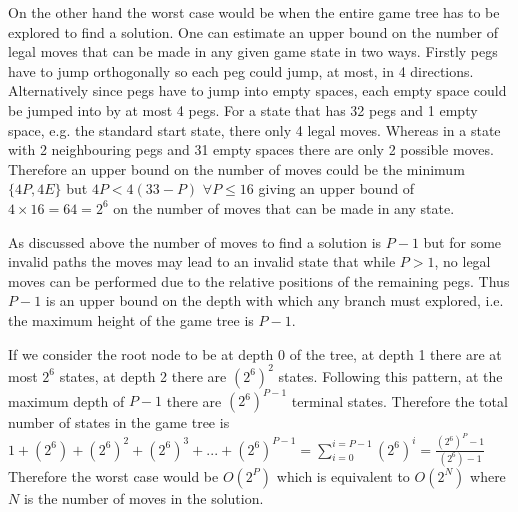 \documentclass[10pt]{article}
\begin{document}
On the other hand the worst case would be when the entire game tree has to be explored to find a solution. One can estimate an upper bound on the number of legal moves that can be made in any given game state in two ways. Firstly pegs have to jump orthogonally so each peg could jump, at most, in 4 directions. Alternatively since pegs have to jump into empty spaces, each empty space could be jumped into by at most 4 pegs. For a state that has 32 pegs and 1 empty space, e.g. the standard start state, there only 4 legal moves. Whereas in a state with 2 neighbouring pegs and 31 empty spaces there are only 2 possible moves. Therefore an upper bound on the number of moves could be the minimum$\{4P,4E\}$ but $4P<4(33-P)$ $\forall P\leq16$ giving an upper bound of $4\times16=64=2^6$ on the number of moves that can be made in any state.

As discussed above the number of moves to find a solution is $P-1$ but for some invalid paths the moves may lead to an invalid state that while $P>1$, no legal moves can be performed due to the relative positions of the remaining pegs. Thus $P-1$ is an upper bound on the depth with which any branch must explored, i.e. the maximum height of the game tree is $P-1$.

If we consider the root node to be at depth $0$ of the tree, at depth 1 there are at most $2^6$ states, at depth 2 there are $(2^6)^2$ states. Following this pattern, at the maximum depth of $P-1$ there are $(2^6)^{P-1}$ terminal states. Therefore the total number of states in the game tree is $1+(2^6)+(2^6)^2+(2^6)^3+...+(2^6)^{P-1}=\sum_{i=0}^{i=P-1} (2^6)^i=\frac{(2^6)^P-1}{(2^6)-1}$
Therefore the worst case would be $O(2^{P})$ which is equivalent to $O(2^{N})$ where $N$ is the number of moves in the solution.
\newpage
\end{document}
